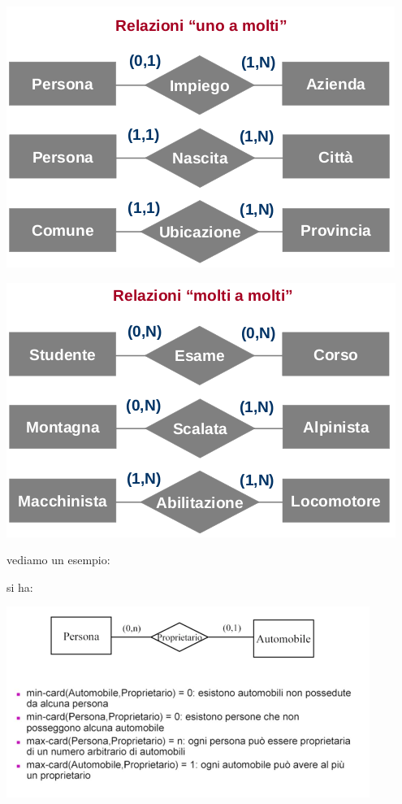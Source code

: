 \documentclass[a4paper,12pt, oneside]{book}
\begin{document}
\begin{center}
\includegraphics[scale=0.6]{img/er6.png}
\end{center}
\begin{center}
\includegraphics[scale=0.6]{img/er5.png}
\end{center}
\newpage
vediamo un esempio:
\begin{esempio}
si ha:
\begin{center}
\includegraphics[scale=0.8]{img/er8.png}
\end{center}

\end{esempio}
\end{document}
